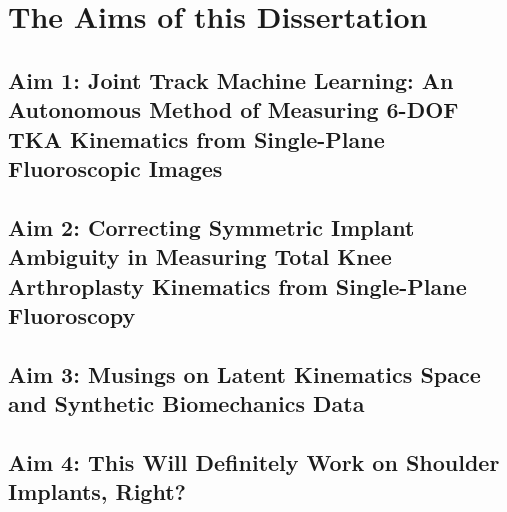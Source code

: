 \chapter{The Aims of this Dissertation}
\label{sec:aims}

\section{Aim 1: Joint Track Machine Learning: An Autonomous Method of Measuring 6-DOF TKA Kinematics from Single-Plane Fluoroscopic Images}
\label{sec:aim1}


\section{Aim 2: Correcting Symmetric Implant Ambiguity in Measuring Total Knee Arthroplasty Kinematics from Single-Plane Fluoroscopy}
\label{sec:aim2}


\section{Aim 3: Musings on Latent Kinematics Space and Synthetic Biomechanics Data}
\label{sec:aim3}


\section{Aim 4: This Will Definitely Work on Shoulder Implants, Right?}
\label{sec:aim4}




